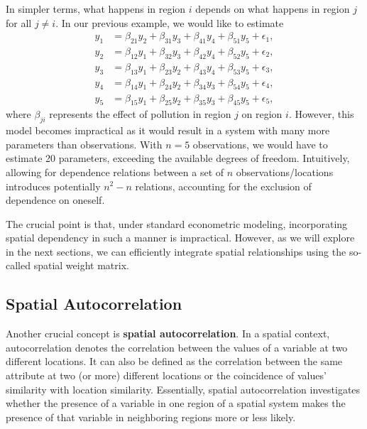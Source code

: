 \documentclass[english,12pt]{book}\usepackage[]{graphicx}\usepackage[]{xcolor}
\begin{document}
In simpler terms, what happens in region $i$ depends on what happens in region $j$ for all $j \neq i$. In our previous example, we would like to estimate 
\begin{equation*}
  \begin{aligned}
y_1 & = \beta_{21} y_2 + \beta_{31} y_3 + \beta_{41} y_4 + \beta_{51} y_5 + \epsilon_1, \\
y_2 & = \beta_{12} y_1 + \beta_{32} y_3 + \beta_{42} y_4 + \beta_{52} y_5 + \epsilon_2, \\
y_3 & = \beta_{13} y_1 + \beta_{23} y_2 + \beta_{43} y_4 + \beta_{53} y_5 + \epsilon_3, \\
y_4 & = \beta_{14} y_1 + \beta_{24} y_2 + \beta_{34} y_3 + \beta_{54} y_5 + \epsilon_4, \\
y_5 & = \beta_{15} y_1 + \beta_{25} y_2 + \beta_{35} y_3 + \beta_{45} y_5 + \epsilon_5, 
\end{aligned}
\end{equation*}
%
where $\beta_{ji}$ represents the effect of pollution in region $j$ on region $i$. However, this model becomes impractical as it would result in a system with many more parameters than observations. With $n = 5$ observations, we would have to estimate 20 parameters, exceeding the available degrees of freedom. Intuitively, allowing for dependence relations between a set of $n$ observations/locations introduces potentially $n^2 - n$ relations, accounting for the exclusion of dependence on oneself.

The crucial point is that, under standard econometric modeling, incorporating spatial dependency in such a manner is impractical. However, as we will explore in the next sections, we can efficiently integrate spatial relationships using the so-called spatial weight matrix. 

\subsection{Spatial Autocorrelation}\label{sec:Spatial_autocorrelation}

Another crucial concept is \textbf{spatial autocorrelation}. In a spatial context, autocorrelation denotes the correlation between the values of a variable at two different locations. It can also be defined as the correlation between the same attribute at two (or more) different locations or the coincidence of values' similarity with location similarity. Essentially, spatial autocorrelation investigates whether the presence of a variable in one region of a spatial system makes the presence of that variable in neighboring regions more or less likely.
\end{document}
